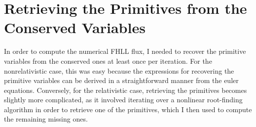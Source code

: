 \section{Retrieving the Primitives from the Conserved Variables}
In order to compute the numerical FHLL flux, I needed to recover the primitive variables from the conserved ones at least once per iteration. For the nonrelativistic case, this was easy because the expressions for recovering the primitive variables can be derived in a straightforward manner from the euler equations. Conversely, for the relativistic case, retrieving the primitives becomes slightly more complicated, as it involved iterating over a nonlinear root-finding algorithm in order to retrieve one of the primitives, which I then used to compute the remaining missing ones.
